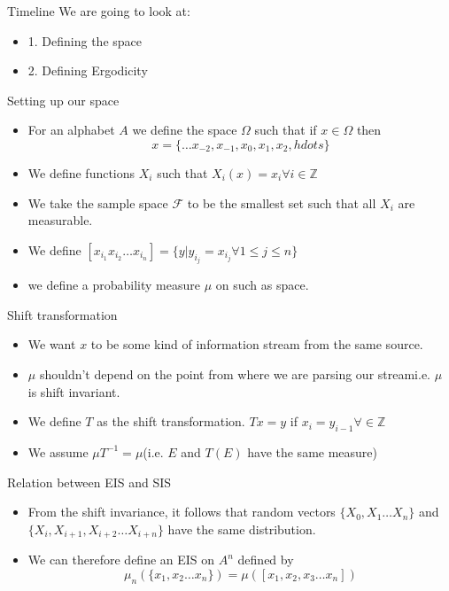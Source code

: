 






\begin{frame}{Timeline}    
    We are going to look at:
    \begin{itemize}
        \item 1. Defining the space
        \item 2. Defining Ergodicity
    \end{itemize}
\end{frame}




\begin{frame}{Setting up our space}
    \begin{itemize}[$\bullet$]
        \item For an alphabet $A$ we define the space $\Omega$ such that if $x\in\Omega$ then
        $$x=\{\hdots x_{-2},x_{-1},x_{0},x_1,x_2,hdots\}$$\pause
        \item We define functions $X_i$ such that $X_i(x)=x_i\forall i\in\mathbb Z$\pause
        \item We take the sample space $\mathcal F$ to be the smallest set such that all $X_i$ are measurable.
        \item We define $[x_{i_1}x_{i_2}\hdots x_{i_n}]=\{y|y_{i_j}=x_{i_j}\forall 1\leq j\leq n\}$
        \item we define a probability measure $\mu$ on such as space.
    \end{itemize}
\end{frame}


\begin{frame}{Shift transformation}
\begin{itemize}[$\bullet$]
    \item We want $x$ to be some kind of information stream from the same source. \pause
    \item $\mu$ shouldn't depend on the point from where we are parsing our stream\pause i.e. $\mu$ is shift invariant.\pause
    \item We define $T$ as the shift transformation. $Tx=y$ if $x_i=y_{i-1}\forall\in\mathbb Z$\pause
    \item We assume $\mu T^{-1}=\mu$(i.e. $E$ and $T(E)$ have the same measure)\pause
\end{itemize}    
\end{frame}

\begin{frame}{Relation between EIS and SIS}
    \begin{itemize}[$\bullet$]
        \item From the shift invariance, it follows that random vectors $\{X_0,X_1\hdots X_n\}$ and $\{X_i,X_{i+1},X_{i+2}\hdots X_{i+n}\}$ have the same distribution.
        \item We can therefore define an EIS on $A^n$ defined by
        $$\mu_n(\{x_1,x_2\hdots x_n\})=\mu([x_1,x_2,x_3\hdots x_n])$$
    \end{itemize}
\end{frame}

